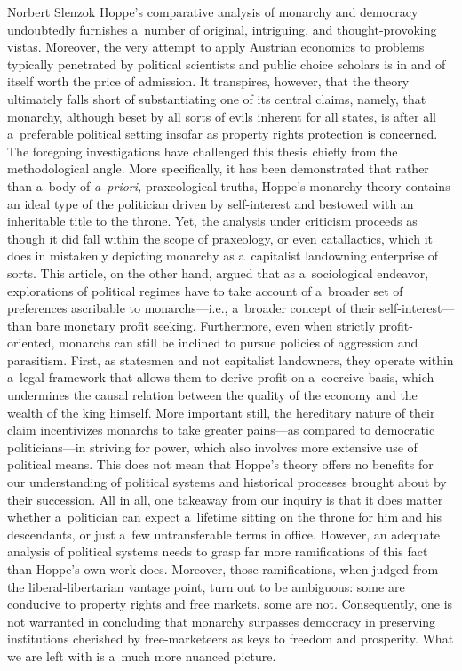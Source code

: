 \begin{artengenv}{Norbert Slenzok}
Hoppe's comparative analysis of monarchy and democracy undoubtedly furnishes a~number of original, intriguing, and thought-provoking vistas. Moreover, the very attempt to apply Austrian economics to problems typically penetrated by political scientists and public choice scholars is in and of itself worth the price of admission. It transpires, however, that the theory ultimately falls short of substantiating one of its central claims, namely, that monarchy, although beset by all sorts of evils inherent for all states, is after all a~preferable political setting insofar as property rights protection is concerned. The foregoing investigations have challenged this thesis chiefly from the methodological angle. More specifically, it has been demonstrated that rather than a~body of \textit{a~priori,} praxeological truths, Hoppe's monarchy theory contains an ideal type of the politician driven by self-interest and bestowed with an inheritable title to the throne. Yet, the analysis under criticism proceeds as though it did fall within the scope of praxeology, or even catallactics, which it does in mistakenly depicting monarchy as a~capitalist landowning enterprise of sorts. This article, on the other hand, argued that as a~sociological endeavor, explorations of political regimes have to take account of a~broader set of preferences ascribable to monarchs---i.e., a~broader concept of their self-interest---than bare monetary profit seeking. Furthermore, even when strictly profit-oriented, monarchs can still be inclined to pursue policies of aggression and parasitism. First, as statesmen and not capitalist landowners, they operate within a~legal framework that allows them to derive profit on a~coercive basis, which undermines the causal relation between the quality of the economy and the wealth of the king himself. More important still, the hereditary nature of their claim incentivizes monarchs to take greater pains---as compared to democratic politicians---in striving for power, which also involves more extensive use of political means. This does not mean that Hoppe's theory offers no benefits for our understanding of political systems and historical processes brought about by their succession. All in all, one takeaway from our inquiry is that it does matter whether a~politician can expect a~lifetime sitting on the throne for him and his descendants, or just a~few untransferable terms in office. However, an adequate analysis of political systems needs to grasp far more ramifications of this fact than Hoppe's own work does. Moreover, those ramifications, when judged from the liberal-libertarian vantage point, turn out to be ambiguous: some are conducive to property rights and free markets, some are not. Consequently, one is not warranted in concluding that monarchy surpasses democracy in preserving institutions cherished by free-marketeers as keys to freedom and prosperity. What we are left with is a~much more nuanced picture.
\enlargethispage{1.5\baselineskip}








\end{artengenv}

\label{slenzok-last}